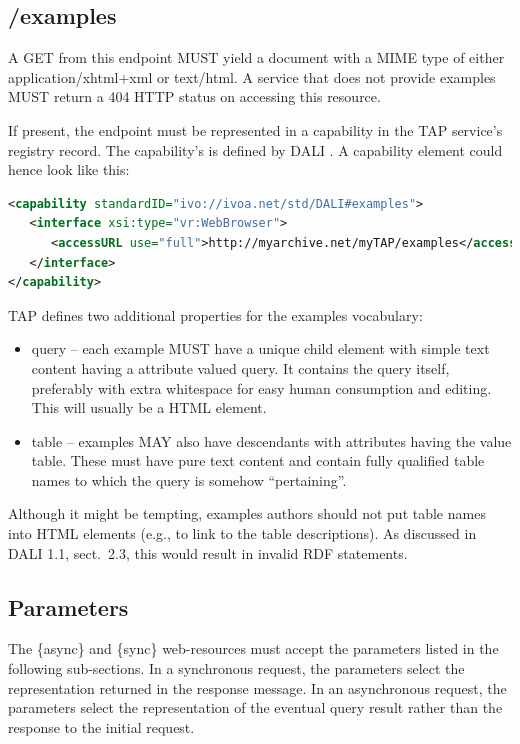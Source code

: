 \documentclass[11pt,letter]{ivoa}
\begin{document}
\subsection{/examples}
\label{sec:dali-examples}

A GET from this endpoint MUST yield a document with a MIME type of either 
application/xhtml+xml or text/html. A service that does not provide examples 
MUST return a 404 HTTP status on accessing this resource.

If present, the endpoint must be represented in a capability in the TAP 
service's registry record. The capability's  is defined by
DALI
\citep{std:DALI}. A capability element could hence look like this:

\begin{lstlisting}[language=XML,basicstyle=\footnotesize]
<capability standardID="ivo://ivoa.net/std/DALI#examples">
   <interface xsi:type="vr:WebBrowser">
      <accessURL use="full">http://myarchive.net/myTAP/examples</accessURL>
   </interface>
</capability>
\end{lstlisting}

TAP defines two additional properties for the examples vocabulary:

\begin{itemize}
\item query -- each example MUST have a unique child element with simple text 
content having a  attribute valued query. It contains the query itself, 
preferably with extra whitespace for easy human consumption and editing. This 
will usually be a HTML  element.
    
\item table -- examples MAY also have descendants with  attributes having 
the value table. These must have pure text content and contain fully qualified 
table names to which the query is somehow ``pertaining''.
\end{itemize}

Although it might be tempting, examples authors should not put table
names into HTML  elements (e.g., to link to the table
descriptions).  As discussed in DALI 1.1, sect.~2.3, this would result
in invalid RDF statements.

\subsection{Parameters}
\label{sec:parameters}

The \{async\} and \{sync\} web-resources must accept the parameters listed in 
the following sub-sections. In a synchronous request, the parameters select the 
representation returned in the response message. In an asynchronous request, the 
parameters select the representation of the eventual query result rather than 
the response to the initial request.
\end{document}
